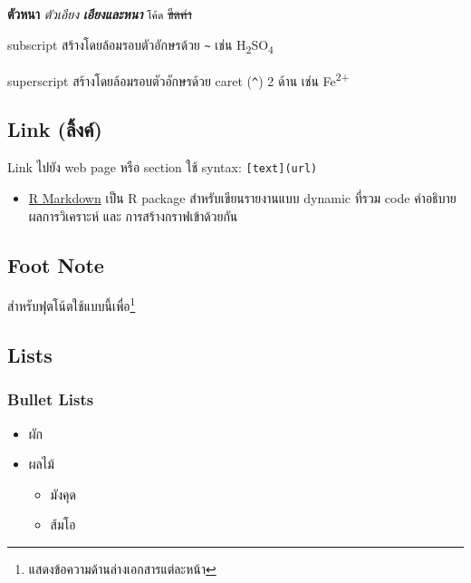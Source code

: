 \documentclass[
]{article}
\providecommand{\tightlist}{%
  \setlength{\itemsep}{0pt}\setlength{\parskip}{0pt}}
\begin{document}
\textbf{ตัวหนา} \emph{ตัวเอียง} \textbf{\emph{เอียงและหนา}}
\texttt{โค้ด} \sout{ขีดค่า}

subscript สร้างโดยล้อมรอบตัวอักษรด้วย \texttt{\textasciitilde{}} เช่น
H\textsubscript{2}SO\textsubscript{4}

superscript สร้างโดยล้อมรอบตัวอักษรด้วย caret (\texttt{\^{}}) 2 ด้าน
เช่น Fe\textsuperscript{2+}

\hypertarget{link-uxe25uxe07uxe04}{%
\subsection{Link (ลิ้งค์)}\label{link-uxe25uxe07uxe04}}

Link ไปยัง web page หรือ section ใช้ syntax: \texttt{{[}text{]}(url)}

\begin{itemize}
\tightlist
\item
  \href{https://rmarkdown.rstudio.com}{R Markdown} เป็น R package
  สำหรับเขียนรายงานแบบ dynamic ที่รวม code คำอธิบาย ผลการวิเคราะห์ และ
  การสร้างกราฟเข้าด้วยกัน
\end{itemize}

\hypertarget{foot-note}{%
\subsection{Foot Note}\label{foot-note}}

สำหรับฟุตโน้ตใช้แบบนี้เพื่อ\footnote{แสดงข้อความด้านล่างเอกสารแต่ละหน้า}

\hypertarget{lists}{%
\subsection{Lists}\label{lists}}

\hypertarget{bullet-lists}{%
\subsubsection{Bullet Lists}\label{bullet-lists}}

\begin{itemize}
\item
  ผัก
\item
  ผลไม้

  \begin{itemize}
  \tightlist
  \item
    มังคุด
  \item
    ส้มโอ
  \end{itemize}
\end{itemize}
\end{document}

